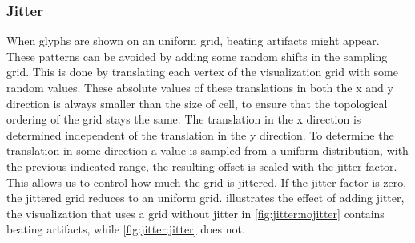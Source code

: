 \subsubsection{Jitter} %
\label{ssub:jitter}
When glyphs are shown on an uniform grid, beating artifacts might appear. These patterns can be avoided by adding some random shifts in the sampling grid. This is done by translating each vertex of the visualization grid with some random values. These absolute values of these translations in both the x and y direction is always smaller than the size of cell, to ensure that the topological ordering of the grid stays the same. The translation in the x direction is determined independent of the translation in the y direction. To determine the translation in some direction a value is sampled from a uniform distribution, with the previous indicated range, the resulting offset is scaled with the jitter factor. This allows us to control how much the grid is jittered.  If the jitter factor is zero, the jittered grid reduces to an uniform grid.  illustrates the effect of adding jitter, the visualization that uses a grid without jitter in \cref{fig:jitter:nojitter} contains beating artifacts, while \cref{fig:jitter:jitter} does not.
